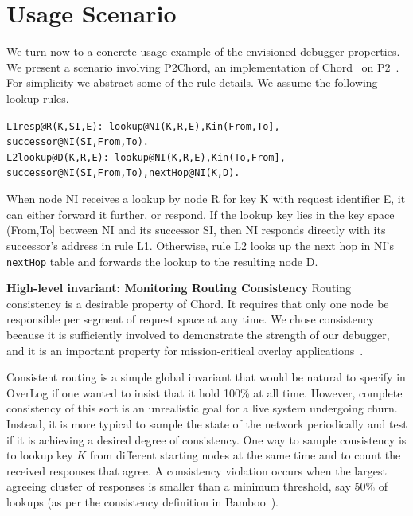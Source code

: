 \documentclass[10pt,twocolumn]{article}
\def\Sys{P2\xspace}
\def\Lang{OverLog\xspace}
\newenvironment{overlog}{\begin{alltt}\footnotesize}{\end{alltt}}
\newcommand{\ol}[1]{{\tt\footnotesize#1}}
\begin{document}
\section{Usage Scenario}
\label{sec:scenario}

We turn now to a concrete usage example of the
envisioned debugger properties.  We present a scenario involving
P2Chord, an implementation of Chord~\cite{Stoica2003} on \Sys~\cite{Loo2005SOSP}.
For simplicity we abstract some of the rule
details. We assume the following lookup rules.
\begin{overlog}
L1 resp@R(K,SI,E) :- lookup@NI(K,R,E),K in (From,To],
     successor@NI(SI,From,To).
L2 lookup@D(K,R,E) :- lookup@NI(K,R,E),K in (To,From],
     successor@NI(SI,From,To),nextHop@NI(K,D).
\end{overlog}
When node NI receives a lookup by node R for key K
with request identifier E, it can either forward it further, or respond.
If the lookup key lies in the key space (From,To] between NI
and its successor SI, then NI responds directly with its
successor's address in rule L1.  Otherwise, rule L2 looks up the next
hop in NI's \ol{nextHop} table and forwards the lookup to the
resulting node D.


{\bf High-level invariant: Monitoring Routing Consistency} 
Routing consistency is a desirable property of  
Chord. It requires that
only one node be responsible per segment of request space at any time.
We chose consistency
because it is sufficiently involved to demonstrate the strength of our 
debugger, and it is an important property for mission-critical
overlay applications~\cite{MSRPastry-2004}.

Consistent routing is a simple global invariant that would be natural
to specify in \Lang if one wanted to insist that it hold 100\% at all
time.  However, complete consistency of this sort is an unrealistic
goal for a live system undergoing churn.
Instead, it is more typical to sample the state of the network
periodically and test if it is achieving a desired degree of
consistency.  One way to sample consistency is
to lookup key $K$ from different starting nodes at the same time and
to count the received responses that agree.  A consistency violation
occurs when the largest agreeing cluster of responses is smaller than
a minimum threshold, say 50\% of lookups (as per the consistency
definition in Bamboo~\cite{rhea_usenix_2004}).
\end{document}
